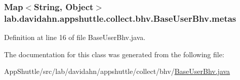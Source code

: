 \hypertarget{classlab_1_1davidahn_1_1appshuttle_1_1collect_1_1bhv_1_1_base_user_bhv_ae79f5563e46ad25778555114ac80faff}{
\subsubsection[{metas}]{\setlength{\rightskip}{0pt plus 5cm}\-Map$<$\-String, \-Object$>$ {\bf lab.\-davidahn.\-appshuttle.\-collect.\-bhv.\-Base\-User\-Bhv.\-metas}}}\label{classlab_1_1davidahn_1_1appshuttle_1_1collect_1_1bhv_1_1_base_user_bhv_ae79f5563e46ad25778555114ac80faff}


\-Definition at line 16 of file \-Base\-User\-Bhv.\-java.



\-The documentation for this class was generated from the following file\-:\begin{DoxyCompactItemize}
\item 
\-App\-Shuttle/src/lab/davidahn/appshuttle/collect/bhv/\hyperlink{_base_user_bhv_8java}{\-Base\-User\-Bhv.\-java}\end{DoxyCompactItemize}
